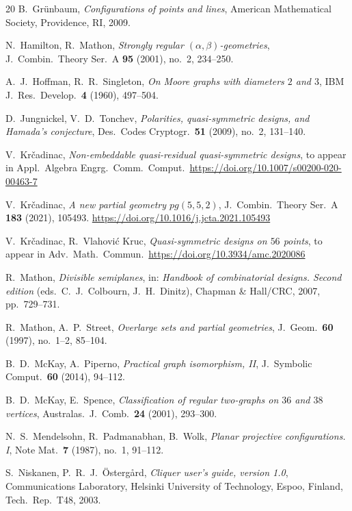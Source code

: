 \documentclass[12pt, reqno]{amsart}
\begin{document}
\begin{thebibliography}{20}
B.~Gr\"{u}nbaum, \emph{Configurations of points and lines},
American Mathematical Society, Providence, RI, 2009.

N.~Hamilton, R.~Mathon, \emph{Strongly regular
$(\alpha,\beta)$-geometries}, J.\ Combin.\ Theory Ser.\ A
\textbf{95} (2001), no.\ 2, 234--250.

A.~J.~Hoffman, R.~R.~Singleton, \emph{On Moore graphs with diameters
$2$ and $3$}, IBM J.\ Res.\ Develop.\ \textbf{4} (1960), 497--504.

D.~Jungnickel, V.~D.~Tonchev, \emph{Polarities, quasi-symmetric designs,
and Hamada's conjecture}, Des.\ Codes Cryptogr.\ \textbf{51} (2009),
no.\ 2, 131--140.

V.~Kr\v{c}adinac, \emph{Non-embeddable quasi-residual quasi-symmetric designs},
to appear in Appl.\ Algebra Engrg.\ Comm.\ Comput.\ \url{https://doi.org/10.1007/s00200-020-00463-7}

V.~Kr\v{c}adinac, \emph{A new partial geometry $pg(5,5,2)$},
J.\ Combin.\ Theory Ser.\ A \textbf{183} (2021), 105493.
\url{https://doi.org/10.1016/j.jcta.2021.105493}

V.~Kr\v{c}adinac, R.~Vlahovi\'{c} Kruc,
\emph{Quasi-symmetric designs on $56$ points}, to appear in
Adv.\ Math.\ Commun.\ \url{https://doi.org/10.3934/amc.2020086}

R.~Mathon, \emph{Divisible semiplanes}, in: \emph{Handbook of
combinatorial designs. Second edition} (eds.\ C.~J.~Colbourn,
J.~H.~Dinitz), Chapman \& Hall/CRC, 2007, pp.\ 729--731.

R.~Mathon, A.~P.~Street, \emph{Overlarge sets and partial geometries},
J.\ Geom.\ \textbf{60} (1997), no.\ 1--2, 85--104.

B.~D.~McKay, A.~Piperno,
\emph{Practical graph isomorphism, II},
J.\ Symbolic Comput.\ \textbf{60} (2014), 94--112.

B.~D.~McKay, E.~Spence, \emph{Classification of regular two-graphs
on $36$ and $38$ vertices}, Australas.\ J.\ Comb.\ \textbf{24} (2001),
293--300.

N.~S.~Mendelsohn, R.~Padmanabhan, B.~Wolk, \emph{Planar projective
configurations. I}, Note Mat.\ \textbf{7} (1987), no.\ 1, 91--112.

S.~Niskanen, P.~R.~J.~\"{O}sterg\aa{}rd, \emph{Cliquer user's guide,
version 1.0}, Communications Laboratory, Helsinki University of
Technology, Espoo, Finland, Tech.\ Rep.\ T48, 2003.


\end{thebibliography}
\end{document}
